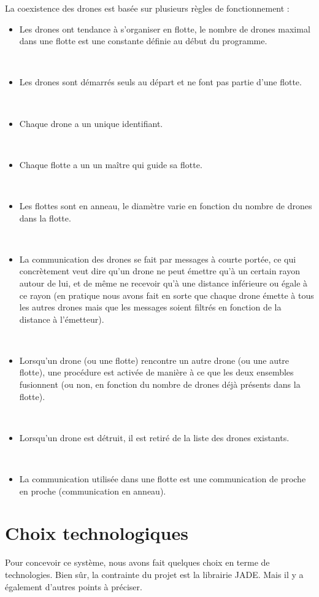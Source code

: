 \documentclass[11pt]{report}
\begin{document}
La coexistence des drones est basée sur plusieurs règles de fonctionnement : 

\begin{itemize}
\item Les drones ont tendance à s'organiser en flotte, le nombre de drones maximal dans une flotte est une constante définie au début du programme.

~\
\item Les drones sont démarrés seuls au départ et ne font pas partie d'une flotte.

~\
\item Chaque drone a un unique identifiant.

~\
\item Chaque flotte a un un maître qui guide sa flotte.

~\
\item Les flottes sont en anneau, le diamètre varie en fonction du nombre de drones dans la flotte.

~\
\item La communication des drones se fait par messages à courte portée, ce qui concrètement veut dire qu'un drone ne peut émettre qu'à un certain rayon autour de lui, et de même ne recevoir qu'à une distance inférieure ou égale à ce rayon (en pratique nous avons fait en sorte que chaque drone émette à tous les autres drones mais que les messages soient filtrés en fonction de la distance à l'émetteur).

~\
\item Lorsqu'un drone (ou une flotte) rencontre un autre drone (ou une autre flotte), une procédure est activée de manière à ce que les deux ensembles fusionnent (ou non, en fonction du nombre de drones déjà présents dans la flotte).

~\
\item Lorsqu'un drone est détruit, il est retiré de la liste des drones existants.

~\
\item La communication utilisée dans une flotte est une communication de proche en proche (communication en anneau).
\end{itemize}

\section{Choix technologiques}

Pour concevoir ce système, nous avons fait quelques choix en terme de technologies. Bien sûr, la contrainte du projet est la librairie JADE. Mais il y a également d'autres points à préciser.
\end{document}
